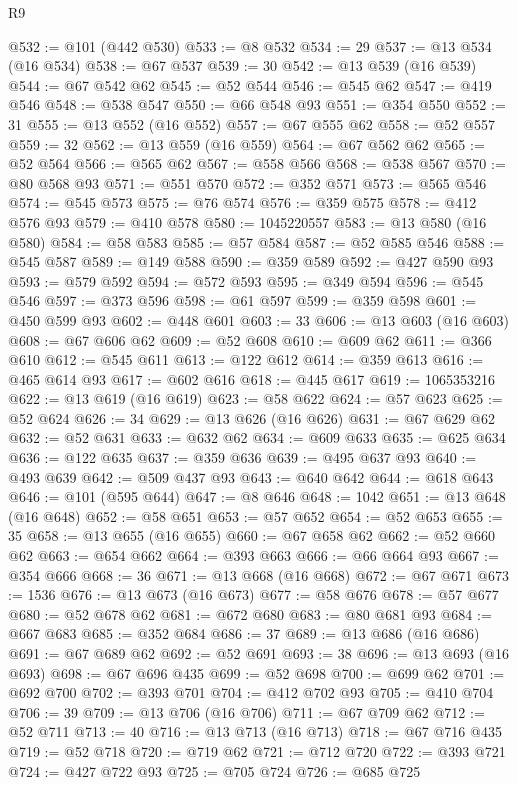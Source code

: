 \begin{lexlean}{R9}
\begin{coremodule}
@532 := @101 (@442 @530)
@533 := @8 @532
@534 := 29
@537 := @13 @534 (@16 @534)
@538 := @67 @537
@539 := 30
@542 := @13 @539 (@16 @539)
@544 := @67 @542 @62
@545 := @52 @544
@546 := @545 @62
@547 := @419 @546
@548 := @538 @547
@550 := @66 @548 @93
@551 := @354 @550
@552 := 31
@555 := @13 @552 (@16 @552)
@557 := @67 @555 @62
@558 := @52 @557
@559 := 32
@562 := @13 @559 (@16 @559)
@564 := @67 @562 @62
@565 := @52 @564
@566 := @565 @62
@567 := @558 @566
@568 := @538 @567
@570 := @80 @568 @93
@571 := @551 @570
@572 := @352 @571
@573 := @565 @546
@574 := @545 @573
@575 := @76 @574
@576 := @359 @575
@578 := @412 @576 @93
@579 := @410 @578
@580 := 1045220557
@583 := @13 @580 (@16 @580)
@584 := @58 @583
@585 := @57 @584
@587 := @52 @585 @546
@588 := @545 @587
@589 := @149 @588
@590 := @359 @589
@592 := @427 @590 @93
@593 := @579 @592
@594 := @572 @593
@595 := @349 @594
@596 := @545 @546
@597 := @373 @596
@598 := @61 @597
@599 := @359 @598
@601 := @450 @599 @93
@602 := @448 @601
@603 := 33
@606 := @13 @603 (@16 @603)
@608 := @67 @606 @62
@609 := @52 @608
@610 := @609 @62
@611 := @366 @610
@612 := @545 @611
@613 := @122 @612
@614 := @359 @613
@616 := @465 @614 @93
@617 := @602 @616
@618 := @445 @617
@619 := 1065353216
@622 := @13 @619 (@16 @619)
@623 := @58 @622
@624 := @57 @623
@625 := @52 @624
@626 := 34
@629 := @13 @626 (@16 @626)
@631 := @67 @629 @62
@632 := @52 @631
@633 := @632 @62
@634 := @609 @633
@635 := @625 @634
@636 := @122 @635
@637 := @359 @636
@639 := @495 @637 @93
@640 := @493 @639
@642 := @509 @437 @93
@643 := @640 @642
@644 := @618 @643
@646 := @101 (@595 @644)
@647 := @8 @646
@648 := 1042
@651 := @13 @648 (@16 @648)
@652 := @58 @651
@653 := @57 @652
@654 := @52 @653
@655 := 35
@658 := @13 @655 (@16 @655)
@660 := @67 @658 @62
@662 := @52 @660 @62
@663 := @654 @662
@664 := @393 @663
@666 := @66 @664 @93
@667 := @354 @666
@668 := 36
@671 := @13 @668 (@16 @668)
@672 := @67 @671
@673 := 1536
@676 := @13 @673 (@16 @673)
@677 := @58 @676
@678 := @57 @677
@680 := @52 @678 @62
@681 := @672 @680
@683 := @80 @681 @93
@684 := @667 @683
@685 := @352 @684
@686 := 37
@689 := @13 @686 (@16 @686)
@691 := @67 @689 @62
@692 := @52 @691
@693 := 38
@696 := @13 @693 (@16 @693)
@698 := @67 @696 @435
@699 := @52 @698
@700 := @699 @62
@701 := @692 @700
@702 := @393 @701
@704 := @412 @702 @93
@705 := @410 @704
@706 := 39
@709 := @13 @706 (@16 @706)
@711 := @67 @709 @62
@712 := @52 @711
@713 := 40
@716 := @13 @713 (@16 @713)
@718 := @67 @716 @435
@719 := @52 @718
@720 := @719 @62
@721 := @712 @720
@722 := @393 @721
@724 := @427 @722 @93
@725 := @705 @724
@726 := @685 @725

\end{coremodule}
\end{lexlean}
